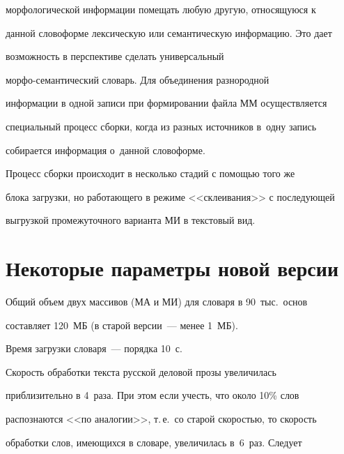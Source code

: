 морфологической информации помещать любую другую, относящуюся к

данной словоформе лексическую или семантическую информацию. Это дает

возможность в перспективе сделать универсальный

    мор\-фо-се\-ман\-ти\-че\-ский словарь. Для объединения разнородной

информации в одной записи при формировании файла ММ осуществляется

специальный процесс сборки, когда из разных источников в~одну запись

собирается информация о~данной словоформе.

{



}



    Процесс сборки происходит в несколько стадий с помощью того же

блока загрузки, но работающего в режиме <<склеивания>> с последующей

выгрузкой промежуточного варианта МИ в текстовый вид.






\section{ Некоторые параметры новой версии}



\vspace*{-2pt}



    Общий объем двух массивов (МА и МИ) для словаря в 90~тыс.\ основ

со\-став\-ля\-ет 120~МБ (в старой версии~--- менее 1~МБ).



    Время загрузки словаря~--- порядка 10~с.



    Скорость обработки текста русской деловой прозы увеличилась

приблизительно в 4~раза. При этом если учесть, что около 10\% слов

распознаются <<по аналогии>>, т.\,е.\ со старой скоростью, то скорость

обработки слов, имеющихся в словаре, увеличилась в~6~раз. Следует


